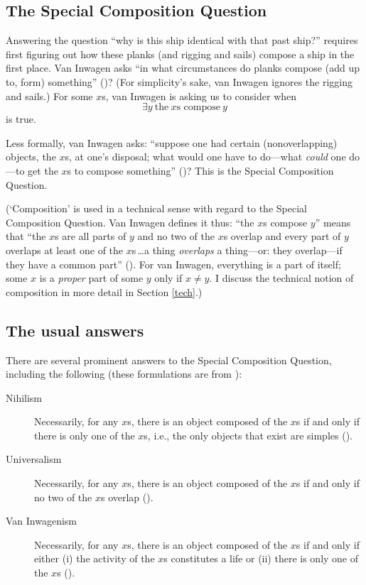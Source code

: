 \documentclass[11pt]{article}
\begin{document}
\begin{spacing}{1.5}
\subsection{The Special Composition Question}
\label{scq}
Answering the question ``why is this ship identical with that past
ship?'' requires first figuring out how these planks (and rigging and
sails) compose a ship in the first place.  Van Inwagen asks ``in what
circumstances do planks compose (add up to, form) something''
(\citeyear[21]{inwagen1995})?  (For simplicity's sake, van Inwagen
ignores the rigging and sails.)  For some $x$s, van Inwagen is asking
us to consider when
\begin{displaymath}
\exists y\ \text{the}\ x\text{s compose}\ y
\end{displaymath}
is true.

Less formally, van Inwagen asks: ``suppose one had certain
(nonoverlapping) objects, the $x$s, at one's disposal; what would one
have to do---what {\em could} one do---to get the $x$s to compose
something'' (\citeyear[31]{inwagen1995})?  This is the Special
Composition Question.

(`Composition' is used in a technical sense with regard to the Special
Composition Question.  Van Inwagen defines it thus: ``the $x$s compose
$y$'' means that ``the $x$s are all parts of $y$ and no two of the
$x$s overlap and every part of $y$ overlaps at least one of the
$x$s\,\ldots a thing {\em overlaps} a thing---or: they overlap---if
they have a common part'' (\citeyear[29]{inwagen1995}).  For van
Inwagen, everything is a part of itself; some $x$ is a {\em proper}
part of some $y$ only if $x \neq y$.  I discuss the technical notion
of composition in more detail in Section \ref{tech}.)

\subsection{The usual answers}
\label{scq-ans}
There are several prominent answers to the Special Composition
Question, including the following (these formulations are from
\citet{markosian1998a}):
\begin{description}
	\item[Nihilism] Necessarily, for any $x$s, there is an object
          composed of the $x$s if and only if there is only one of the
          $x$s, i.e., the only objects that exist are simples
          (\citeyear[219]{markosian1998a}).
	\item[Universalism] Necessarily, for any $x$s, there is an
          object composed of the $x$s if and only if no two of the
          $x$s overlap (\citeyear[227]{markosian1998a}).
	\item[Van Inwagenism] Necessarily, for any $x$s, there is an
          object composed of the $x$s if and only if either (i) the
          activity of the $x$s constitutes a life or (ii) there is
          only one of the $x$s (\citeyear[221]{markosian1998a}).
\end{description}


\end{spacing}
\end{document}
